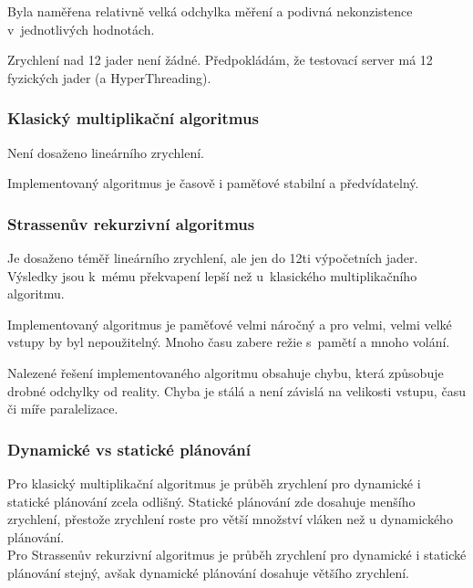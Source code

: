 \documentclass[12pt,a4paper]{article}
\begin{document}
Byla naměřena relativně velká odchylka měření a podivná nekonzistence v~jednotlivých hodnotách. 
\bigskip

Zrychlení nad 12 jader není žádné. Předpokládám, že testovací server má 12 fyzických jader (a HyperThreading).

\subsubsection{Klasický multiplikační algoritmus}

Není dosaženo lineárního zrychlení.
\bigskip

Implementovaný algoritmus je časově i paměťové stabilní a předvídatelný.


\subsubsection{Strassenův rekurzivní algoritmus}

Je dosaženo téměř lineárního zrychlení, ale jen do 12ti výpočetních jader. Výsledky jsou k~mému překvapení lepší než u~klasického multiplikačního algoritmu.
\bigskip

Implementovaný algoritmus je paměťové velmi náročný a pro velmi, velmi velké vstupy by byl nepoužitelný. Mnoho času zabere režie s~pamětí a mnoho volání.
\bigskip

Nalezené řešení implementovaného algoritmu obsahuje chybu, která způsobuje drobné odchylky od reality. Chyba je stálá a není závislá na velikosti vstupu, času či míře paralelizace.

\subsubsection{Dynamické vs statické plánování}


Pro klasický multiplikační algoritmus je průběh zrychlení pro dynamické i statické plánování zcela odlišný. Statické plánování zde dosahuje menšího zrychlení, přestože zrychlení roste pro větší množství vláken než u dynamického plánování. \\


Pro Strassenův rekurzivní algoritmus je průběh zrychlení pro dynamické i statické plánování stejný, avšak dynamické plánování dosahuje většího zrychlení.


%
\end{document}
